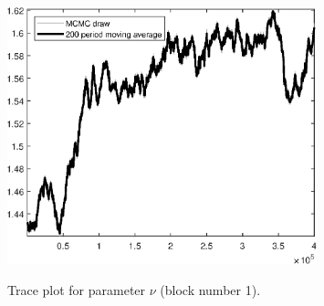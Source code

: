 \begin{figure}[H]
\centering
  \includegraphics[width=0.8\textwidth]{BRS_growth/graphs/TracePlot_nu_blck_1}\\
    \caption{Trace plot for parameter $\nu$ (block number 1).}
\end{figure}
